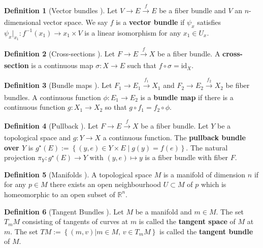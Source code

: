 \documentclass[12pt]{article}
\theoremstyle{definition}
\newtheorem{defn}{Definition}
\begin{document}
\begin{defn}[Vector bundles \cite{topology-fiber-bundles}]
    Let \(V \rightarrow E \xrightarrow[]{f} E\) be a fiber bundle and \(V\) an
    \(n\)-dimensional vector space. We say \(f\) is a
    \textbf{vector bundle} if \(\psi_x\) satisfies
    \(\psi_x \vert_{x_1} : f^{-1}(x_1) \rightarrow {x_1}\times V\) is a linear
    isomorphism for any \(x_1 \in U_x\).
\end{defn}

\begin{defn}[Cross-sections \cite{topology-fiber-bundles}]
    Let \(F \rightarrow E \xrightarrow[]{f} X\) be a fiber bundle.
    A \textbf{cross-section} is a continuous map \(\sigma : X \rightarrow E\)
    such that \(f \circ \sigma = \text{id}_X\).
\end{defn}

\begin{defn}[Bundle maps \cite{topology-fiber-bundles}]
    Let \(F_1 \rightarrow E_1 \xrightarrow[]{f_1} X_1\) and 
    \(F_2 \rightarrow E_2 \xrightarrow[]{f_2} X_2\) be fiber bundles. A
    continuous function \(\phi : E_1 \rightarrow E_2\) is a \textbf{bundle map}
    if there is a continuous function \(g : X_1 \rightarrow X_2\) so that
    \(g \circ f_1 = f_2 \circ \phi\).
\end{defn}

\begin{defn}[Pullback \cite{topology-fiber-bundles}]
    Let \(F \rightarrow E \xrightarrow[]{f} X\) be a fiber bundle. Let \(Y\) be
    a topological space and \(g : Y \rightarrow X\) a continuous function. The
    \textbf{pullback bundle over \(Y\)} is 
    \(g^\star(E) := \left\{ (y,e)\in Y \times E \mid g(y) = f(e)\right\}\). The
    natural projection \(\pi_Y : g^\star(E) \rightarrow Y\) with 
    \((y,e) \mapsto y\) is a fiber bundle with fiber \(F\).
\end{defn}

\begin{defn}[Manifolds \cite{intro-top-manifolds}]
    A topological space \(M\) is a manifold of dimension \(n\) if for any
    \(p \in M\) there exists an open neighbourhood \(U \subset M\) of \(p\)
    which is homeomorphic to an open subset of \(\mathbb{R}^n\).
\end{defn}

\begin{defn}[Tangent Bundles \cite{geometric-control}]
    Let \(M\) be a manifold and \(m \in M\). The set \(T_mM\) consisting of
    tangents of curves at \(m\) is called the \textbf{tangent space} of \(M\) at
    \(m\). The set \(TM := \left\{(m,v) | m \in M,\, v \in T_mM\right\}\) is
    called the \textbf{tangent bundle} of \(M\).
\end{defn}
\end{document}
